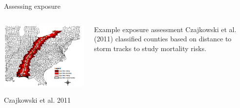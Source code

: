 \documentclass[ignorenonframetext,]{beamer}
\begin{document}
\begin{frame}{Assessing exposure}

\begin{columns}
\begin{column}{0.7\textwidth}

\begin{center}\includegraphics[width=\textwidth]{coastal_inland_mortality_figure} \end{center}
\vspace{-0.3cm}
\begin{center}
\footnotesize Czajkowski et al. 2011
\end{center}
\end{column}
\begin{column}{0.3\textwidth}
\small
\begin{block}{Example exposure assessment}
Czajkowski et al. (2011) classified counties based on distance to storm tracks to study mortality risks.
\end{block}
\end{column}
\end{columns}

\end{frame}
\end{document}
